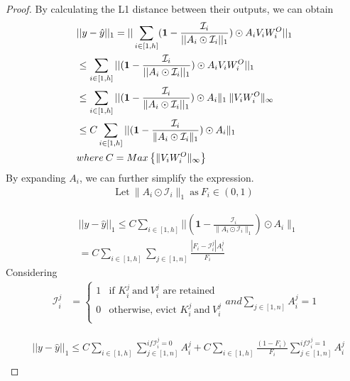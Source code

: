 \begin{proof}
	By calculating the L1 distance between their outputs, we can obtain
	{
		\begin{align}
			&||y-\hat{y}||_1 = ||\sum_{i\in [1, h]}  (\textbf{1}-\frac{\mathcal{I}_i}{||A_i \odot \mathcal{I}_i||_1}) \odot A_i V_iW_i^O||_1  \\ 
			&\leq  \sum_{i\in [1, h]}||  (\textbf{1}-\frac{\mathcal{I}_i}{||A_i \odot \mathcal{I}_i||_1}) \odot A_i V_iW_i^O||_1 \\
			&\leq \sum_{i\in [1, h]}||  (\textbf{1}-\frac{\mathcal{I}_i}{\lVert A_i \odot \mathcal{I}_i||_1}) \odot A_i\rVert_{1} \:  \lVert V_iW_i^O\rVert_{\infty} \\
			&\leq C \sum_{i\in [1, h]}||  (\textbf{1}-\frac{\mathcal{I}_i}{\lVert A_i \odot \mathcal{I}_i\rVert_1}) \odot A_i\rVert_{1} \\
			&where \: C = Max\left\{\lVert V_iW_i^O\rVert_{\infty} \right\} \notag
		\end{align}
	}
	By expanding $A_i$, we can further simplify the expression.
	\begin{align}
		\text{Let} \: \lVert A_i \odot \mathcal{I}_i\rVert_1 \: \text{as} \: F_i \in (0,1)
	\end{align}
	{
		\begin{align}
			&||y-\hat{y}||_1 \leq C \sum_{i\in [1, h]}||  (\textbf{1}-\frac{\mathcal{I}_i}{\lVert A_i \odot \mathcal{I}_i\rVert_1}) \odot A_i\rVert_{1} \\
			& =  C \sum_{i\in [1, h]} \sum_{j \in [1, n]} \frac{|F_i-\mathcal{I}_i^j|A_i^j}{F_i} 
		\end{align}
		Considering 
		\begin{align}
			\mathcal{I}_i^j & = 
			\begin{cases} 
				1 		&  \text{if  $K_i^j \: \text{and} \: V_i^j$ are retained }\\
				0 &\text{otherwise, evict  $K_i^j \: \text{and} \: V_i^j$}\\
			\end{cases}
			and \sum_{j \in [1,n] }A_i^j = 1
		\end{align}

		\begin{align}
			&||y-\hat{y}||_1	 \leq C \sum_{i\in [1, h]} \sum_{j \in [1, n]}^{if \mathcal{I}_i^j=0} A_i^j + C \sum_{i\in [1, h]} \frac{(1 - F_i)}{F_i} \sum_{j \in [1, n]}^{if \mathcal{I}_i^j=1}{A_i^j} \\

\end{align}}
\end{proof}
